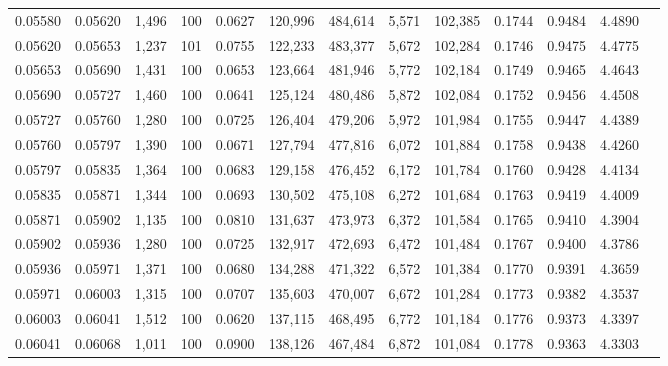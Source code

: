 \begin{tabular}{rrrrrrrrrrrrr}
0.05580 & 0.05620 & 1,496 & 100 &                                     0.0627 & 120,996 & 484,614 &   5,571 & 102,385 & 0.1744 & 0.9484 & 4.4890 \\
0.05620 & 0.05653 & 1,237 & 101 &                                     0.0755 & 122,233 & 483,377 &   5,672 & 102,284 & 0.1746 & 0.9475 & 4.4775 \\
0.05653 & 0.05690 & 1,431 & 100 &                                     0.0653 & 123,664 & 481,946 &   5,772 & 102,184 & 0.1749 & 0.9465 & 4.4643 \\
0.05690 & 0.05727 & 1,460 & 100 &                                     0.0641 & 125,124 & 480,486 &   5,872 & 102,084 & 0.1752 & 0.9456 & 4.4508 \\
0.05727 & 0.05760 & 1,280 & 100 &                                     0.0725 & 126,404 & 479,206 &   5,972 & 101,984 & 0.1755 & 0.9447 & 4.4389 \\
0.05760 & 0.05797 & 1,390 & 100 &                                     0.0671 & 127,794 & 477,816 &   6,072 & 101,884 & 0.1758 & 0.9438 & 4.4260 \\
0.05797 & 0.05835 & 1,364 & 100 &                                     0.0683 & 129,158 & 476,452 &   6,172 & 101,784 & 0.1760 & 0.9428 & 4.4134 \\
0.05835 & 0.05871 & 1,344 & 100 &                                     0.0693 & 130,502 & 475,108 &   6,272 & 101,684 & 0.1763 & 0.9419 & 4.4009 \\
0.05871 & 0.05902 & 1,135 & 100 &                                     0.0810 & 131,637 & 473,973 &   6,372 & 101,584 & 0.1765 & 0.9410 & 4.3904 \\
0.05902 & 0.05936 & 1,280 & 100 &                                     0.0725 & 132,917 & 472,693 &   6,472 & 101,484 & 0.1767 & 0.9400 & 4.3786 \\
0.05936 & 0.05971 & 1,371 & 100 &                                     0.0680 & 134,288 & 471,322 &   6,572 & 101,384 & 0.1770 & 0.9391 & 4.3659 \\
0.05971 & 0.06003 & 1,315 & 100 &                                     0.0707 & 135,603 & 470,007 &   6,672 & 101,284 & 0.1773 & 0.9382 & 4.3537 \\
0.06003 & 0.06041 & 1,512 & 100 &                                     0.0620 & 137,115 & 468,495 &   6,772 & 101,184 & 0.1776 & 0.9373 & 4.3397 \\
0.06041 & 0.06068 & 1,011 & 100 &                                     0.0900 & 138,126 & 467,484 &   6,872 & 101,084 & 0.1778 & 0.9363 & 4.3303 \\

\end{tabular}
